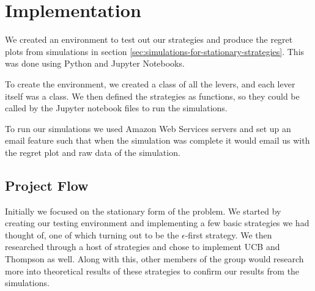 \section{Implementation}\label{sec:implementation}

We created an environment to test out our strategies and produce the regret plots from simulations in section \ref{sec:simulations-for-stationary-strategies}.
This was done using Python and Jupyter Notebooks.

To create the environment, we created a class of all the levers, and each lever itself was a class.
We then defined the strategies as functions, so they could be called by the Jupyter notebook files to run the simulations.

To run our simulations we used Amazon Web Services servers and set up an email feature such that when the simulation was complete it would email us with the regret plot and raw data of the simulation.

\subsection{Project Flow}\label{subsec:project-flow}

Initially we focused on the stationary form of the problem.
We started by creating our testing environment and implementing a few basic strategies we had thought of, one of which turning out to be the $\epsilon$-first strategy.
We then researched through a host of strategies and chose to implement UCB and Thompson as well.
Along with this, other members of the group would research more into theoretical results of these strategies to confirm our results from the simulations.